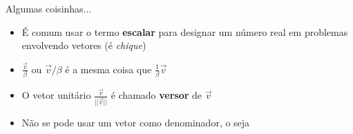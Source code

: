 \begin{frame}[c]{Algumas coisinhas...}

    \begin{itemize}
        \item É comum usar o termo \textbf{escalar} para designar um número real em problemas envolvendo vetores (é \textit{chique})
        \item \(\frac{\vec{v}}{\beta}\) ou \(\vec{v}/\beta\) é a mesma coisa que \(\frac{1}{\beta}\vec{v}\)
        \item O vetor unitário \(\frac{\vec{v}}{||\vec{v}||}\) é chamado \textbf{versor} de \(\vec{v}\)
        \item Não se pode usar um vetor como denominador, o seja
            \begin{center}
            \end{center}
    \end{itemize}

\end{frame}

